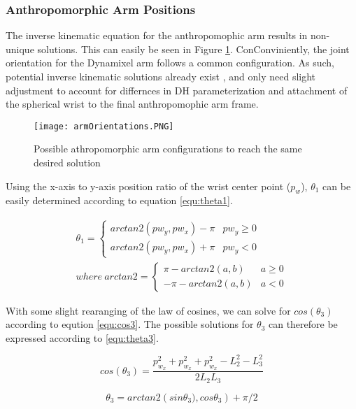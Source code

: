 \documentclass[10pt,journal]{IEEEtran}
\begin{document}
\subsubsection{Anthropomorphic Arm Positions}
The inverse kinematic equation for the anthropomophic arm results in non-unique solutions. This can easily be seen in Figure \ref{fig:armOrientations}. ConConviniently, the joint orientation for the Dynamixel arm follows a common configuration. As such, potential inverse kinematic solutions already exist \cite{siciliano2009robotics}, and only need slight adjustment to account for differnces in DH parameterization and attachment of the spherical wrist to the final anthropomophic arm frame.

\begin{figure}[ht!]
\centering
\texttt{[image: armOrientations.PNG]}
\caption{Possible athropomorphic arm configurations to reach the same desired solution}
\label{fig:armOrientations}
\end{figure}

Using the x-axis to y-axis position ratio of the wrist center point ($p_w$), $\theta_1$ can be easily determined according to equation \ref{equ:theta1}. 

\begin{align} \label{equ:theta1}
	\theta_1 = 
		\begin{cases}
			arctan2(pw_y,pw_x) - \pi & pw_y \geq 0  \\
			arctan2(pw_y,pw_x) + \pi & pw_y < 0 
		\end{cases} 
	\\
	where\ arctan2 = 
		\begin{cases}
			\pi - arctan2(a,b) & a \geq 0 \\
			-\pi - arctan2(a,b) & a < 0
		\end{cases} 
\end{align}

With some slight rearanging of the law of cosines, we can solve for $cos(\theta_3)$ according to eqution \ref{equ:cos3}. The possible solutions for $\theta_3$ can therefore be expressed according to \ref{equ:theta3}.

\begin{equation}\label{equ:cos3}
	cos(\theta_3) = \frac{p^2_{w_x} + p^2_{w_x} + p^2_{w_x} - L_2^2 - L_3^2}{2 L_2 L_3}
\end{equation}

\begin{equation}\label{equ:theta3}
	\theta_3 = arctan2(sin{\theta_3),cos{\theta_3}}) + \pi/2
\end{equation}
\end{document}

